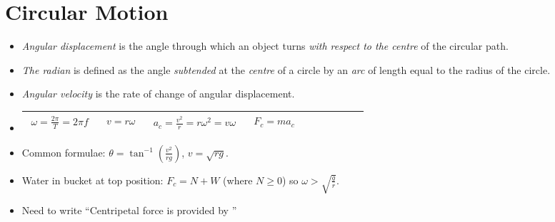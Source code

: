 \documentclass[oneside]{book}
\begin{document}
\chapter{Circular Motion}
\begin{itemize}
    \item \textit{Angular displacement} is the angle through which an object turns \emph{with respect to the centre} of the circular path.
    \item \textit{The radian} is defined as the angle \emph{subtended} at the \emph{centre} of a circle by an \emph{arc} of length equal to the radius of the circle. 
    \item \textit{Angular velocity} is the rate of change of angular displacement.
\end{itemize}
\begin{itemize}[label=\(\square\)]
    \item \begin{tabular}{|Sc|Sc|Sc|Sc|Sc|}
        \hline
            \(\begin{aligned}
                \omega=\frac{2\pi}{T}=2\pi f
            \end{aligned}\)&
            \(\begin{aligned}
                v=r\omega
            \end{aligned}\)&
            \(\begin{aligned}
                a_c=\frac{v^2}{r}=r\omega^2=v\omega
            \end{aligned}\)&
            \(\begin{aligned}
                F_c=ma_c
            \end{aligned}\)
        \\
        \hline
    \end{tabular}
    \item Common formulae: \(\theta=\tan^{-1}\left(\frac{v^2}{rg}\right)\), \(v=\sqrt{rg}\).
    \item Water in bucket at top position: \(F_c=N+W\) (where \(N\geq 0\)) so \(\omega>\sqrt{\frac{g}{r}}\).
    \item Need to write ``Centripetal force is provided by \underline{\hspace{1cm}}'' 
\end{itemize}
\end{document}
